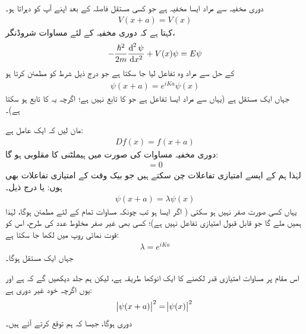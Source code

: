 دوری مخفیہ سے مراد ایسا مخفیہ ہے جو کسی مستقل فاصلہ  کے بعد اپنے آپ کو دہراتا ہو۔ 
\begin{align}\label{مساوات_متماثل_دوری_مخفیہ_کنگھی}
	V(x+a) = V(x)
\end{align}
 کہتا ہے کہ دوری مخفیہ کے لئے مساوات شروڈنگر،
\begin{align}
	-\frac{\hslash^{2}}{2m}\frac{\dif^{\,2}\psi}{\dif x^{2}} +V(x)\psi = E\psi
\end{align}
کے حل سے مراد وہ تفاعل لیا جا سکتا ہے جو درج ذیل شرط کو مطمئن کرتا ہو
\begin{align}\label{مساوات_متماثل_اگلا}
	\psi(x+a) = e^{iKa}\psi(x)
\end{align}
جہاں  ایک مستقل ہے (یہاں  سے مراد ایسا تفاعل ہے جو  کا تابع نہیں ہے؛ اگرچہ یہ  کا تابع ہو سکتا ہے)۔

 مان لیں کہ  ایک عامل ہے:
\begin{align}
	Df(x) = f(x+a)
\end{align}
دوری مخفیہ مساوات  کی صورت میں  ہیملٹنی کا مقلوبی ہو گا:
\begin{align}
	[D, H] = 0
\end{align}
لہٰذا ہم  کے ایسے امتیازی تفاعلات چن سکتے ہیں جو بیک وقت  کے امتیازی تفاعلات بھی ہوں: یا درج ذیل۔
\begin{align}\label{مساوات_متماثل_دوری_تفاعل_الف}
	\psi(x+a) = \lambda\psi(x)
\end{align}
یہاں  کسی صورت صفر نہیں ہو سکتی ( اگر ایسا ہو تب چونکہ مساوات  تمام  کے لئے مطمئن ہوگا، لہٰذا ہمیں  ملے گا جو قابل قبول امتیازی تفاعل نہیں ہے)؛ کسی بھی غیر صفر مخلوط عدد کی طرح، اس کو قوت نمائی روپ میں لکھا جا سکتا ہے: 
\begin{align}\label{مساوت_متماثل_قوت_نما_مستقل}
	\lambda = e^{iKa}
\end{align}
جہاں  ایک مستقل ہوگا۔

اس مقام پر مساوات  امتیازی قدر  لکھنے کا ایک انوکھا طریقہ ہے، لیکن ہم جلد دیکھیں گے کہ  ہے اور یوں اگرچہ  خود غیر دوری ہے:
\begin{align}\label{مساوات_متماثل_آخری_مقام_تفاعل_ابتدائی}
	\abs{\psi(x+a)}^{2} = \abs{\psi(x)}^{2}
\end{align}
دوری ہوگا، جیسا کہ ہم توقع کرتے آئے ہیں۔


